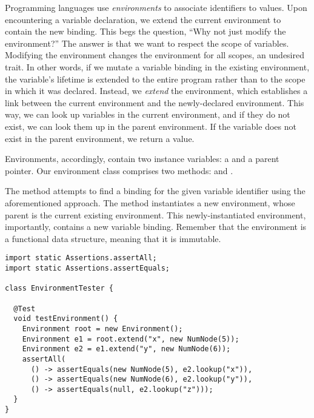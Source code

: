 Programming languages use \emph{environments} to associate identifiers to values. 
Upon encountering a variable declaration, we extend the current environment to contain the new binding. 
This begs the question, ``Why not just modify the environment?'' 
The answer is that we want to respect the scope of variables. 
Modifying the environment changes the environment for all scopes, an undesired trait. 
In other words, if we mutate a variable binding in the existing environment, the variable's lifetime is extended to the entire program rather than to the scope in which it was declared.
Instead, we \emph{extend} the environment, which establishes a link between the current environment and the newly-declared environment. 
This way, we can look up variables in the current environment, and if they do not exist, we can look them up in the parent environment. 
If the variable does not exist in the parent environment, we return a  value.

Environments, accordingly, contain two instance variables: a  and a  parent pointer. Our environment class comprises two methods:  and . 

The  method attempts to find a binding for the given variable identifier using the aforementioned approach. The  method instantiates a new environment, whose parent is the current existing environment. This newly-instantiated environment, importantly, contains a new variable binding. Remember that the environment is a functional data structure, meaning that it is immutable.

\begin{lstlisting}[language=MyJava]
import static Assertions.assertAll;
import static Assertions.assertEquals;

class EnvironmentTester {
  
  @Test
  void testEnvironment() {
    Environment root = new Environment();
    Environment e1 = root.extend("x", new NumNode(5));
    Environment e2 = e1.extend("y", new NumNode(6));
    assertAll(
      () -> assertEquals(new NumNode(5), e2.lookup("x")),
      () -> assertEquals(new NumNode(6), e2.lookup("y")),
      () -> assertEquals(null, e2.lookup("z")));
  }
}
\end{lstlisting}

